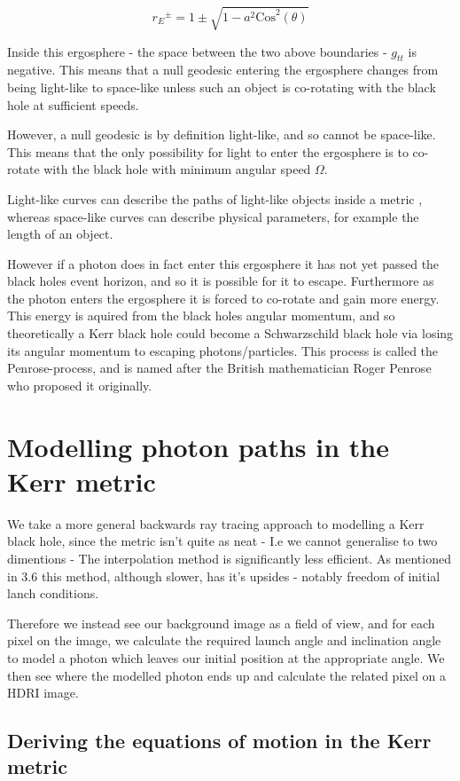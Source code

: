 \documentclass[oneside,openright,frontopenright]{dmathesis}
\begin{document}
	\[{r_{E}}^{\pm} = 1\pm\sqrt{1-a^2\mbox{Cos}^2(\theta)}\]

	Inside this ergosphere - the space between the two above boundaries - $g_{tt}$ is negative. This means that a null geodesic entering the ergosphere changes from being light-like to space-like unless such an object is co-rotating with the black hole at sufficient speeds.

	However, a null geodesic is by definition light-like, and so cannot be space-like. This means that the only possibility for light to enter the ergosphere is to co-rotate with the black hole with minimum angular speed $\Omega$.

	Light-like curves can describe the paths of light-like objects inside a metric , whereas space-like curves can describe physical parameters, for example the length of an object.

	However if a photon does in fact enter this ergosphere it has not yet passed the black holes event horizon, and so it is possible for it to escape. Furthermore as the photon enters the ergosphere it is forced to co-rotate and gain more energy. This energy is aquired from the black holes angular momentum, and so theoretically a Kerr black hole could become a Schwarzschild black hole via losing its angular momentum to escaping photons/particles. This process is called the Penrose-process, and is named after the British mathematician Roger Penrose who proposed it originally.

\chapter{Modelling photon paths in the Kerr metric}

	We take a more general backwards ray tracing approach to modelling a Kerr black hole, since the metric isn't quite as neat - I.e we cannot generalise to two dimentions - The interpolation method is significantly less efficient. As mentioned in 3.6 this method, although slower, has it's upsides - notably freedom of initial lanch conditions.
	
	Therefore we instead see our background image as a field of view, and for each pixel on the image, we calculate the required launch angle and inclination angle to model a photon which leaves our initial position at the appropriate angle. We then see where the modelled photon ends up and calculate the related pixel on a HDRI image.

\section{Deriving the equations of motion in the Kerr metric}
\end{document}
